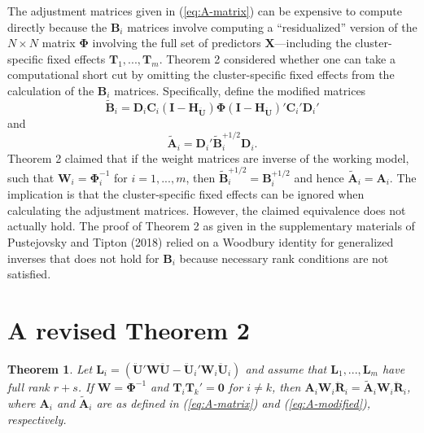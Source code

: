 \documentclass[12pt]{article}
\newtheorem*{thm}{Theorem}
\begin{document}
The adjustment matrices given in (\ref{eq:A-matrix}) can be expensive to
compute directly because the \(\mathbf{B}_i\) matrices involve computing
a ``residualized'' version of the \(N \times N\) matrix
\(\boldsymbol\Phi\) involving the full set of predictors
\(\mathbf{X}\)---including the cluster-specific fixed effects
\(\mathbf{T}_1,...,\mathbf{T}_m\). Theorem 2 considered whether one can
take a computational short cut by omitting the cluster-specific fixed
effects from the calculation of the \(\mathbf{B}_i\) matrices.
Specifically, define the modified matrices \begin{equation}
\label{eq:B-modified}
\mathbf{\tilde{B}}_i = \mathbf{D}_i \mathbf{C}_i \left(\mathbf{I} - \mathbf{H}_{\mathbf{\ddot{U}}}\right) \boldsymbol\Phi \left(\mathbf{I} - \mathbf{H}_{\mathbf{\ddot{U}}}\right)'\mathbf{C}_i' \mathbf{D}_i'
\end{equation} and \begin{equation}
\label{eq:A-modified}
\mathbf{\tilde{A}}_i = \mathbf{D}_i' \mathbf{\tilde{B}}_i^{+1/2} \mathbf{D}_i.
\end{equation} Theorem 2 claimed that if the weight matrices are inverse
of the working model, such that
\(\mathbf{W}_i = \boldsymbol\Phi_i^{-1}\) for \(i = 1,...,m\), then
\(\mathbf{\tilde{B}}_i^{+1/2} = \mathbf{B}_i^{+1/2}\) and hence
\(\mathbf{\tilde{A}}_i = \mathbf{A}_i\). The implication is that the
cluster-specific fixed effects can be ignored when calculating the
adjustment matrices. However, the claimed equivalence does not actually
hold. The proof of Theorem 2 as given in the supplementary materials of
Pustejovsky and Tipton (2018) relied on a Woodbury identity for
generalized inverses that does not hold for \(\mathbf{B}_i\) because
necessary rank conditions are not satisfied.

\hypertarget{a-revised-theorem-2}{%
\section{A revised Theorem 2}\label{a-revised-theorem-2}}

\begin{thm}
\label{thm:absorb}
Let $\mathbf{L}_i = \left(\mathbf{\ddot{U}}'\mathbf{W}\mathbf{\ddot{U}} - \mathbf{\ddot{U}}_i'\mathbf{W}_i\mathbf{\ddot{U}}_i\right)$ and assume that $\mathbf{L}_1,...,\mathbf{L}_m$ have full rank $r + s$. If $\mathbf{W} = \boldsymbol\Phi^{-1}$ and $\mathbf{T}_i \mathbf{T}_k' = \mathbf{0}$ for $i \neq k$, then $\mathbf{A}_i\mathbf{W}_i \mathbf{\ddot{R}}_i = \mathbf{\tilde{A}}_i \mathbf{W}_i \mathbf{\ddot{R}}_i$, where $\mathbf{A}_i$ and $\tilde{\mathbf{A}}_i$ are as defined in (\ref{eq:A-matrix}) and (\ref{eq:A-modified}), respectively.
\end{thm}
\end{document}
